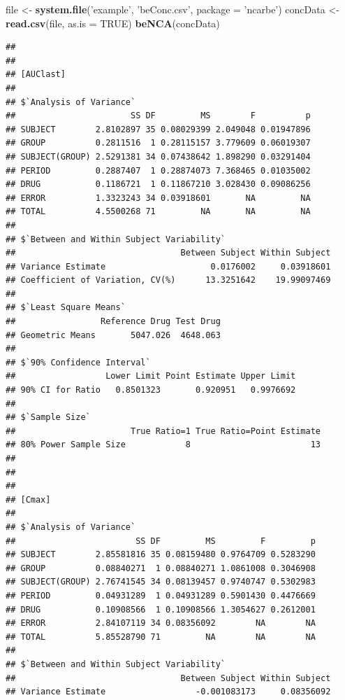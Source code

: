 \documentclass[12pt,]{krantz}
\newenvironment{Shaded}{\begin{snugshade}}{\end{snugshade}}
\newcommand{\KeywordTok}[1]{\textcolor[rgb]{0.13,0.29,0.53}{\textbf{#1}}}
\newcommand{\DataTypeTok}[1]{\textcolor[rgb]{0.13,0.29,0.53}{#1}}
\newcommand{\StringTok}[1]{\textcolor[rgb]{0.31,0.60,0.02}{#1}}
\newcommand{\OtherTok}[1]{\textcolor[rgb]{0.56,0.35,0.01}{#1}}
\newcommand{\NormalTok}[1]{#1}
\theoremstyle{definition}
\theoremstyle{definition}
\theoremstyle{definition}
\theoremstyle{remark}
\begin{document}
\begin{Shaded}
\begin{Highlighting}[]
\NormalTok{file <-}\StringTok{ }\KeywordTok{system.file}\NormalTok{(}\StringTok{'example'}\NormalTok{, }\StringTok{'beConc.csv'}\NormalTok{, }\DataTypeTok{package =} \StringTok{'ncarbe'}\NormalTok{)}
\NormalTok{concData <-}\StringTok{ }\KeywordTok{read.csv}\NormalTok{(file, }\DataTypeTok{as.is =} \OtherTok{TRUE}\NormalTok{)}
\KeywordTok{beNCA}\NormalTok{(concData)}
\end{Highlighting}
\end{Shaded}

\begin{verbatim}
## 
## 
## [AUClast]
## 
## $`Analysis of Variance`
##                       SS DF         MS        F          p
## SUBJECT        2.8102897 35 0.08029399 2.049048 0.01947896
## GROUP          0.2811516  1 0.28115157 3.779609 0.06019307
## SUBJECT(GROUP) 2.5291381 34 0.07438642 1.898290 0.03291404
## PERIOD         0.2887407  1 0.28874073 7.368465 0.01035002
## DRUG           0.1186721  1 0.11867210 3.028430 0.09086256
## ERROR          1.3323243 34 0.03918601       NA         NA
## TOTAL          4.5500268 71         NA       NA         NA
## 
## $`Between and Within Subject Variability`
##                                 Between Subject Within Subject
## Variance Estimate                     0.0176002     0.03918601
## Coefficient of Variation, CV(%)      13.3251642    19.99097469
## 
## $`Least Square Means`
##                 Reference Drug Test Drug
## Geometric Means       5047.026  4648.063
## 
## $`90% Confidence Interval`
##                  Lower Limit Point Estimate Upper Limit
## 90% CI for Ratio   0.8501323       0.920951   0.9976692
## 
## $`Sample Size`
##                       True Ratio=1 True Ratio=Point Estimate
## 80% Power Sample Size            8                        13
## 
## 
## 
## [Cmax]
## 
## $`Analysis of Variance`
##                        SS DF         MS         F         p
## SUBJECT        2.85581816 35 0.08159480 0.9764709 0.5283290
## GROUP          0.08840271  1 0.08840271 1.0861008 0.3046908
## SUBJECT(GROUP) 2.76741545 34 0.08139457 0.9740747 0.5302983
## PERIOD         0.04931289  1 0.04931289 0.5901430 0.4476669
## DRUG           0.10908566  1 0.10908566 1.3054627 0.2612001
## ERROR          2.84107119 34 0.08356092        NA        NA
## TOTAL          5.85528790 71         NA        NA        NA
## 
## $`Between and Within Subject Variability`
##                                 Between Subject Within Subject
## Variance Estimate                  -0.001083173     0.08356092

\end{verbatim}
\end{document}
